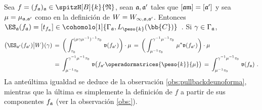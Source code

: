 
Sea $f=(f_{\frak{a}})_{\frak{a}}\in\spitzH[B]{k}{\frak{N}}$, sean
$\frak{a},\frak{a}'$ tales que $[\frak{a}\frak{m}]=[\frak{a}']$ y sea
$\mu=\mu_{\frak{a},\frak{a}'}$ como en la definici\'{o}n de
$W=W_{\infty,\frak{a},\frak{a}'}$. Entonces
\begin{math}
	\ES_{\frak{a}}(f_{\frak{a}})=[t_{f_{\frak{a}}}]\in
		\cohomolo[1]{\Gamma_{\frak{a}},L_{\peso{k}}(\bb{C})}
\end{math}~.
Si $\gamma\in\Gamma_{\frak{a}}$,
\begin{align*}
	\big(\ES_{\frak{a}'}(f_{\frak{a}'})\big\vert W\big)(\gamma) & \,=\,
		\bigg(\int_{\tau_{0}}^{(\mu\gamma\mu^{-1})^{-1}\tau_{0}}\,
			\frak{v}(f_{\frak{a}'})\bigg)\cdot\mu
	\,=\,\bigg(\int_{\mu^{-1}\tau_{0}}^{\gamma^{-1}\mu^{-1}\tau_{0}}\,
			\mu^{*}\frak{v}(f_{\frak{a}'})\bigg)\cdot\mu \\
	& \,=\,\int_{\mu^{-1}\tau_{0}}^{\gamma^{-1}\mu^{-1}\tau_{0}}\,
		\frak{v}\big(f_{\frak{a}'}\operadormatrices{\peso{k}}{\mu}\big)
	\,=\,\int_{\mu^{-1}\tau_{0}}^{\gamma^{-1}\mu^{-1}\tau_{0}}\,
		\frak{v}(f_{\frak{a}})
	\text{ .}
\end{align*}
%
La ante\'{u}ltima igualdad se deduce de la observaci\'{o}n
\ref{obs:pullbackdeunoforma}, mientras que la \'{u}ltima es simplemente la
definici\'{o}n de $f$ a partir de sus componentes $f_{\frak{a}}$ (ver la
observaci\'{o}n \ref{obs:}).

